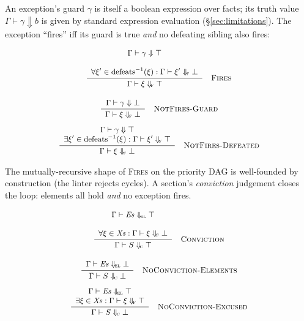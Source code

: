 An exception's guard $\gamma$ is itself a boolean expression
over facts; its truth value $\Gamma \vdash \gamma \Downarrow b$
is given by standard expression evaluation
(\S\ref{sec:limitations}). The exception ``fires'' iff
its guard is true \emph{and} no defeating sibling also fires:

\begin{equation*}
\small
\inferrule[Fires]
  {\Gamma \vdash \gamma \Downarrow \top \\\\
   \forall \xi' \in \mathrm{defeats}^{-1}(\xi) :
   \Gamma \vdash \xi' \Downarrow_{\!\textsc{f}} \bot}
  {\Gamma \vdash \xi \Downarrow_{\!\textsc{f}} \top}
\end{equation*}

\begin{equation*}
\small
\inferrule[NotFires-Guard]
  {\Gamma \vdash \gamma \Downarrow \bot}
  {\Gamma \vdash \xi \Downarrow_{\!\textsc{f}} \bot}
\end{equation*}
\begin{equation*}
\small
\inferrule[NotFires-Defeated]
  {\Gamma \vdash \gamma \Downarrow \top \\
   \exists \xi' \in \mathrm{defeats}^{-1}(\xi) :
   \Gamma \vdash \xi' \Downarrow_{\!\textsc{f}} \top}
  {\Gamma \vdash \xi \Downarrow_{\!\textsc{f}} \bot}
\end{equation*}

The mutually-recursive shape of \textsc{Fires} on the priority
DAG is well-founded by construction (the linter rejects cycles).
A section's \emph{conviction} judgement closes the loop: elements
all hold \emph{and} no exception fires.

\begin{equation*}
\small
\inferrule[Conviction]
  {\Gamma \vdash \mathit{Es} \Downarrow_{\!\textsc{el}} \top \\\\
   \forall \xi \in \mathit{Xs} :
   \Gamma \vdash \xi \Downarrow_{\!\textsc{f}} \bot}
  {\Gamma \vdash S \Downarrow_{\!\textsc{c}} \top}
\end{equation*}

\begin{equation*}
\small
\inferrule[NoConviction-Elements]
  {\Gamma \vdash \mathit{Es} \Downarrow_{\!\textsc{el}} \bot}
  {\Gamma \vdash S \Downarrow_{\!\textsc{c}} \bot}
\end{equation*}
\begin{equation*}
\small
\inferrule[NoConviction-Excused]
  {\Gamma \vdash \mathit{Es} \Downarrow_{\!\textsc{el}} \top \\
   \exists \xi \in \mathit{Xs} :
   \Gamma \vdash \xi \Downarrow_{\!\textsc{f}} \top}
  {\Gamma \vdash S \Downarrow_{\!\textsc{c}} \bot}
\end{equation*}

